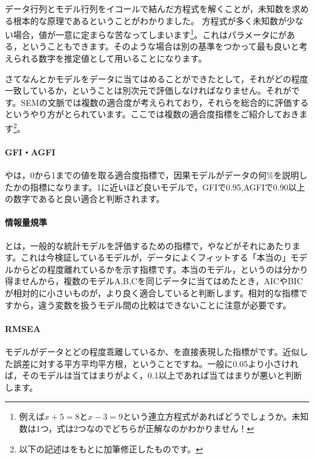 \documentclass{ltjsbook}
\begin{document}
データ行列とモデル行列をイコールで結んだ方程式を解くことが，未知数を求める根本的な原理であるということがわかりました。
方程式が多く未知数が少ない場合，値が一意に定まらな苦なってしまいます\footnote{例えば$x+5=8$と$x-3=9$という連立方程式があればどうでしょうか。未知数は1つ，式は2つなのでどちらが正解なのかわかりません！}。これはパラメータにがある，ということもできます。そのような場合は別の基準をつかって最も良いと考えられる数字を推定値として用いることになります。

さてなんとかモデルをデータに当てはめることができたとして，それがどの程度一致しているか，ということは別次元で評価しなければなりません。それがです。SEMの文脈では複数の適合度が考えられており，それらを総合的に評価するというやり方がとられています。ここでは複数の適合度指標をご紹介しておきます\footnote{以下の記述は\citet{小杉考司2014-01-10}をもとに加筆修正したものです。}。

\paragraph{GFI・AGFI} やは，0から1までの値を取る適合度指標で，因果モデルがデータの何\%を説明したかの指標になります。1に近いほど良いモデルで，GFIで0.95,AGFIで0.90以上の数字であると良い適合と判断されます。

\paragraph{情報量規準}
とは，一般的な統計モデルを評価するための指標で，やなどがそれにあたります。これは今検証しているモデルが，データによくフィットする「本当の」モデルからどの程度離れているかを示す指標です。本当のモデル，というのは分かり得ませんから，複数のモデルA,B,Cを同じデータに当てはめたとき，AICやBICが相対的に小さいものが，より良く適合していると判断します。相対的な指標ですから，違う変数を扱うモデル間の比較はできないことに注意が必要です。
\paragraph{RMSEA}
モデルがデータとどの程度乖離しているか、を直接表現した指標がです。近似した誤差に対する平方平均平方根，ということですね。一般に0.05より小さければ，そのモデルは当てはまりがよく，0.1以上であれば当てはまりが悪いと判断します。
\end{document}
